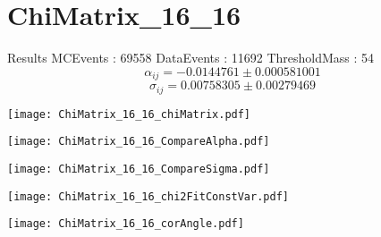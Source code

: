 \documentclass[a4paper,12pt]{article}
\begin{document}
\section{ChiMatrix\_16\_16}
\begin{minipage}{0.49\linewidth} Results \newline
MCEvents : 69558\newline
DataEvents : 11692 \newline
ThresholdMass : 54\\
$$\alpha_{ij} = -0.0144761\pm 0.000581001$$
$$\sigma_{ij} = 0.00758305\pm 0.00279469$$
\end{minipage}\hfill
\begin{minipage}{0.49\linewidth} 
\texttt{[image: ChiMatrix\_16\_16\_chiMatrix.pdf]}\\
\end{minipage}
\hfill
\begin{minipage}{0.49\linewidth} 
\texttt{[image: ChiMatrix\_16\_16\_CompareAlpha.pdf]}\\
\end{minipage}
\hfill
\begin{minipage}{0.49\linewidth} 
\texttt{[image: ChiMatrix\_16\_16\_CompareSigma.pdf]}\\
\end{minipage}
\begin{minipage}{0.49\linewidth} 
\texttt{[image: ChiMatrix\_16\_16\_chi2FitConstVar.pdf]}\\
\end{minipage}
\hfill
\begin{minipage}{0.49\linewidth} 
\texttt{[image: ChiMatrix\_16\_16\_corAngle.pdf]}\\
\end{minipage}
\end{document}
